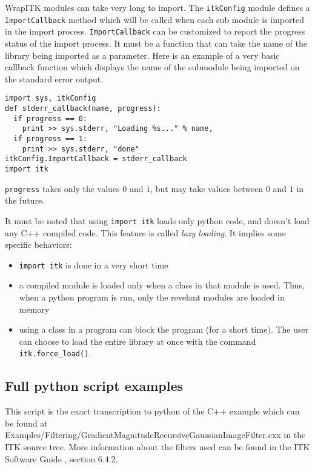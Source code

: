 \documentclass{InsightArticle}
\begin{document}
WrapITK modules can take very long to import. The \verb$itkConfig$ module defines
a \verb$ImportCallback$ method which will be called when each sub module is
imported in the import process. \verb$ImportCallback$ can be customized to report the
progress status of the import process. It must be a function that can take
the name of the library being imported as a parameter. Here is an example of a very
basic callback function which displays the name of the submodule being imported on
the standard error output.
\small \begin{verbatim}
import sys, itkConfig
def stderr_callback(name, progress):
  if progress == 0:
    print >> sys.stderr, "Loading %s..." % name,
  if progress == 1:
    print >> sys.stderr, "done"
itkConfig.ImportCallback = stderr_callback
import itk
\end{verbatim} \normalsize

\verb$progress$ takes only the values $0$ and $1$, but may take values between $0$ and $1$
in the future.

It must be noted that using \verb$import itk$ loads only python code, and doesn't load
any C++ compiled code. This feature is called {\em lazy loading}. It implies some specific
behaviors:
\begin{itemize}
 \item \verb$import itk$ is done in a very short time
 \item a compiled module is loaded only when a class in that module is used. Thus,
when a python program is run, only the revelant modules are loaded in memory
 \item using a class in a program can block the program (for a short time). The user
can choose to load the entire library at once with the command \verb$itk.force_load()$.
\end{itemize}

     \subsection{Full python script examples}

This script is the exact transcription to python of the C++ example 
which can be found at Examples/Filtering/GradientMagnitudeRecursiveGaussianImageFilter.cxx
in the ITK source tree. More information about the filters used can be found in 
the ITK Software Guide \cite{ITKSoftwareGuide}, section 6.4.2.
\end{document}
